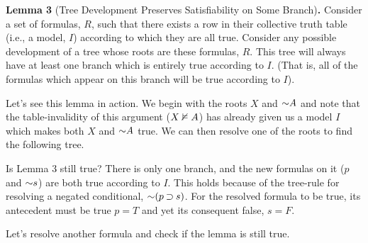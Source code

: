 \documentclass[options]{philosophersimprint}
\begin{document}
\textbf{Lemma 3} (Tree Development Preserves Satisfiability on Some Branch)\textbf{.} Consider a set of formulas, $R$, such that there exists a row in their collective truth table (i.e., a model, $I$) according to which they are all true. Consider any possible development of a tree whose roots are these formulas, $R$. This tree will always have at least one branch which is entirely true according to $I$. (That is, all of the formulas which appear on this branch will be true according to $I$).

Let's see this lemma in action. We begin with the roots $X$ and $\mathord{\sim} A$ and note that the table-invalidity of this argument ($X \nvDash A$) has already given us a model $I$ which makes both $X$ and $\mathord{\sim} A$ true. We can then resolve one of the roots to find the following tree.

\begin{center}
\begin{minipage}[t]{0.27\textwidth}
Is Lemma 3 still true? There is only one branch, and the new formulas on it ($p$ and $\mathord{\sim} s$) are both true according to $I$. This holds because of the tree-rule for resolving a negated conditional, $\mathord{\sim}(p\mathbin{\supset} s)$. For the resolved formula to be true, its antecedent must be true $p=T$ and yet its consequent false, $s=F$.
\end{minipage}
\hfill
\begin{minipage}[t]{0.18\textwidth}
\begin{center}
\end{center}
\end{minipage}
\end{center}

Let's resolve another formula and check if the lemma is still true.
\end{document}
